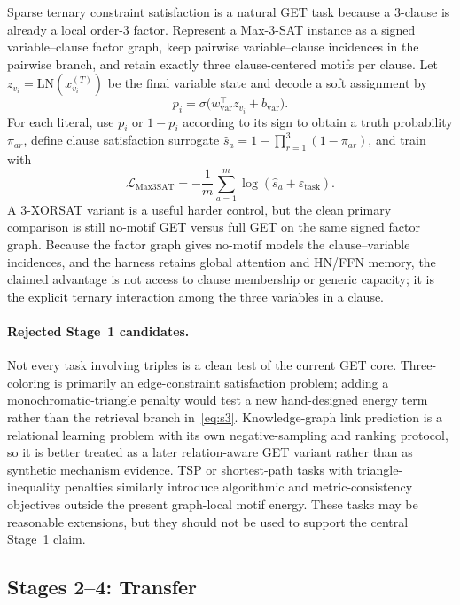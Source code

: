 \documentclass[11pt,a4paper]{article}
\begin{document}
Sparse ternary constraint satisfaction is a natural GET task because a
3-clause is already a local order-3 factor. Represent a Max-3-SAT instance as
a signed variable--clause factor graph, keep pairwise variable--clause
incidences in the pairwise branch, and retain exactly three clause-centered
motifs per clause. Let $z_{v_i}=\mathrm{LN}(x_{v_i}^{(T)})$ be the final
variable state and decode a soft assignment by
\begin{equation}
  p_i = \sigma\!\bigl(w_{\mathrm{var}}^\top z_{v_i} + b_{\mathrm{var}}\bigr).
  \label{eq:sat-variable-head}
\end{equation}
For each literal, use $p_i$ or $1-p_i$ according to its sign to obtain a truth
probability $\pi_{ar}$, define clause satisfaction surrogate
$\hat s_a = 1-\prod_{r=1}^{3}(1-\pi_{ar})$, and train with
\begin{equation}
  \mathcal{L}_{\mathrm{Max3SAT}}
  = -\frac{1}{m}\sum_{a=1}^{m}\log(\hat s_a + \varepsilon_{\mathrm{task}}).
  \label{eq:max3sat-loss}
\end{equation}
A 3-XORSAT variant is a useful harder control, but the clean primary
comparison is still no-motif GET versus full GET on the same signed factor
graph. Because the factor graph gives no-motif models the clause--variable
incidences, and the harness retains global attention and HN/FFN memory, the
claimed advantage is not access to clause membership or generic capacity; it is
the explicit ternary interaction among the three variables in a clause.

\paragraph{Rejected Stage~1 candidates.}
Not every task involving triples is a clean test of the current GET core.
Three-coloring is primarily an edge-constraint satisfaction problem; adding a
monochromatic-triangle penalty would test a new hand-designed energy term
rather than the retrieval branch in~\eqref{eq:s3}. Knowledge-graph link
prediction is a relational learning problem with its own negative-sampling and
ranking protocol, so it is better treated as a later relation-aware GET
variant rather than as synthetic mechanism evidence. TSP or shortest-path
tasks with triangle-inequality penalties similarly introduce algorithmic and
metric-consistency objectives outside the present graph-local motif energy.
These tasks may be reasonable extensions, but they should not be used to
support the central Stage~1 claim.

\subsection{Stages 2--4: Transfer}
\end{document}
